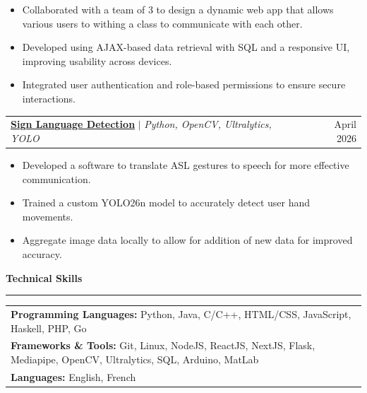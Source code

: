\documentclass[letterpaper]{article}
\newcommand{\ressection}[1]{
    \vspace{1.0em}
    \noindent\textbf{\large #1}
    \par\vspace{0.3em}
    \hrule
    \vspace{0.6em}
}
\begin{document}
\vspace{-0.5em}

\begin{itemize}[leftmargin=2.5em, itemsep=-0.2em]
    \item Collaborated with a team of 3 to design a dynamic web app that allows various users to withing a class to communicate with each other.
    \item Developed using AJAX-based data retrieval with SQL and a responsive UI, improving usability across devices.
    \item Integrated user authentication and role-based permissions to ensure secure interactions.
\end{itemize}

\begin{tabularx}{\textwidth}{X r}
    \textbf{\href{https://github.com/LucaMawyin/signlanguage}{Sign Language Detection}} $|$ \textit{Python, OpenCV, Ultralytics, YOLO} & April 2026 \\
\end{tabularx}

\vspace{-0.5em}

\begin{itemize}[leftmargin=2.5em, itemsep=-0.2em]
    \item Developed a software to translate ASL gestures to speech for more effective communication.
    \item Trained a custom YOLO26n model to accurately detect user hand movements.
    \item Aggregate image data locally to allow for addition of new data for improved accuracy.
\end{itemize}

\ressection{Technical Skills}
\begin{tabularx}{\textwidth}{X}
    \textbf{Programming Languages:} Python, Java, C/C++, HTML/CSS, JavaScript, Haskell, PHP, Go \\
    \textbf{Frameworks \& Tools:} Git, Linux, NodeJS, ReactJS, NextJS, Flask, Mediapipe, OpenCV, Ultralytics, SQL, Arduino, MatLab \\
    \textbf{Languages:} English, French \\
\end{tabularx}
\end{document}
